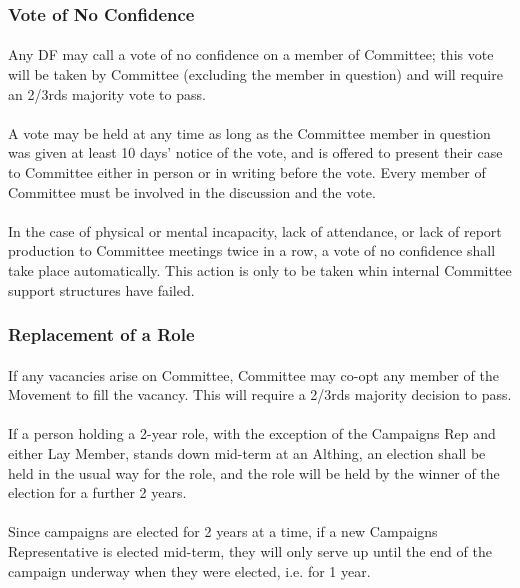\documentclass[a4paper, 11pt]{report}
\begin{document}
\subsubsection{Vote of No Confidence}
\label{sec:noconfidence}
\paragraph{} Any DF may call a vote of no confidence on a member of Committee; this vote will be taken by Committee (excluding the member in question) and will require an 2/3rds majority vote to pass.
\paragraph{} A vote may be held at any time as long as the Committee member in question was given at least 10 days' notice of the vote, and is offered to present their case to Committee either in person or in writing before the vote. Every member of Committee must be involved in the discussion and the vote.
\paragraph{} In the case of physical or mental incapacity, lack of attendance, or lack of report production to Committee meetings twice in a row, a vote of no confidence shall take place automatically.  This action is only to be taken whin internal Committee support structures have failed.
\subsubsection{Replacement of a Role}
\label{sec:rolereplacement}
\paragraph{} If any vacancies arise on Committee, Committee may co-opt any member of the Movement to fill the vacancy. This will require a 2/3rds majority decision to pass.
\paragraph{} If a person holding a 2-year role, with the exception of the Campaigns Rep and either Lay Member, stands down mid-term at an Althing, an election shall be held in the usual way for the role, and the role will be held by the winner of the election for a further 2 years.
\paragraph{} Since campaigns are elected for 2 years at a time, if a new Campaigns Representative is elected mid-term, they will only serve up until the end of the campaign underway when they were elected, i.e. for 1 year.
\end{document}
